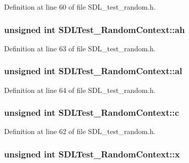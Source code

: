 Definition at line 60 of file S\-D\-L\-\_\-test\-\_\-random.\-h.

\hypertarget{struct_s_d_l_test___random_context_a2c8d2f1ee16cdfd38361b8f03b3fdb85}{
\subsubsection[{ah}]{\setlength{\rightskip}{0pt plus 5cm}unsigned {\bf int} S\-D\-L\-Test\-\_\-\-Random\-Context\-::ah}}\label{struct_s_d_l_test___random_context_a2c8d2f1ee16cdfd38361b8f03b3fdb85}


Definition at line 63 of file S\-D\-L\-\_\-test\-\_\-random.\-h.

\hypertarget{struct_s_d_l_test___random_context_a0e2bccd3611d383d6510c6c828aa54c4}{
\subsubsection[{al}]{\setlength{\rightskip}{0pt plus 5cm}unsigned {\bf int} S\-D\-L\-Test\-\_\-\-Random\-Context\-::al}}\label{struct_s_d_l_test___random_context_a0e2bccd3611d383d6510c6c828aa54c4}


Definition at line 64 of file S\-D\-L\-\_\-test\-\_\-random.\-h.

\hypertarget{struct_s_d_l_test___random_context_a17a6a7e7b68a33c67d9b74c8c7c33198}{
\subsubsection[{c}]{\setlength{\rightskip}{0pt plus 5cm}unsigned {\bf int} S\-D\-L\-Test\-\_\-\-Random\-Context\-::c}}\label{struct_s_d_l_test___random_context_a17a6a7e7b68a33c67d9b74c8c7c33198}


Definition at line 62 of file S\-D\-L\-\_\-test\-\_\-random.\-h.

\hypertarget{struct_s_d_l_test___random_context_a8bd6d1b4e1677ed1c06f5cc09f1af5b6}{
\subsubsection[{x}]{\setlength{\rightskip}{0pt plus 5cm}unsigned {\bf int} S\-D\-L\-Test\-\_\-\-Random\-Context\-::x}}\label{struct_s_d_l_test___random_context_a8bd6d1b4e1677ed1c06f5cc09f1af5b6}


